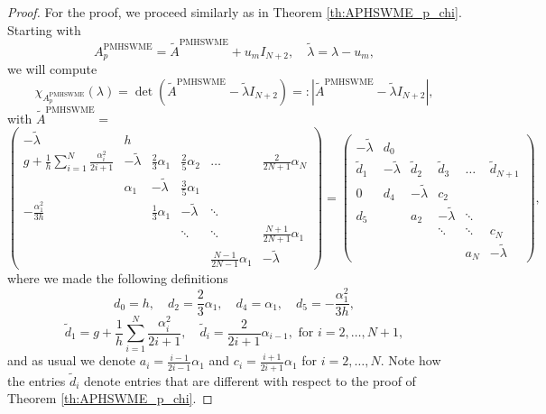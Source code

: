 \documentclass[10pt,a4paper]{amsart}
\begin{document}
\begin{proof}
    For the proof, we proceed similarly as in Theorem \ref{th:APHSWME_p_chi}. Starting with
    \begin{equation}
       A^{\textrm{PMHSWME}}_{p} = \widetilde{A}^{{\textrm{PMHSWME}}} + u_m I_{N+2}, \quad \widetilde{\lambda} = \lambda - u_m,
    \end{equation}
    we will compute
    \begin{equation}
       \chi_{A^{\textrm{PMHSWME}}_{p}}(\lambda) = \det\left( \widetilde{A}^{{\textrm{PMHSWME}}} - \widetilde{\lambda} I_{N+2} \right) =: \left| \widetilde{A}^{{\textrm{PMHSWME}}} - \widetilde{\lambda} I_{N+2} \right|,
    \end{equation}
    with $\widetilde{A}^{{\textrm{PMHSWME}}} =$
    \begin{equation}
        \left(\begin{array}{cccccc}
        - \widetilde{\lambda} & h &  &  &  &  \\
        g + \frac{1}{h} \sum\limits_{i=1}^N \frac{\alpha_i^2}{2i+1} & - \widetilde{\lambda} & \frac{2}{3} \alpha_1 & \frac{2}{5} \alpha_2 & \dots & \frac{2}{2N+1} \alpha_N \\
         & \alpha_1 & - \widetilde{\lambda} & \frac{3}{5} \alpha_1 & &\\
        -\frac{\alpha_1^2}{3h} &   & \frac{1}{3}\alpha_1 & - \widetilde{\lambda} & \ddots & \\
         &  &  & \ddots & \ddots & \frac{N+1}{2N+1}\alpha_1 \\
         &  &  &  & \frac{N-1}{2N-1}\alpha_1 & - \widetilde{\lambda}
        \end{array}\right) =
        \left(\begin{array}{cccccc}
        - \widetilde{\lambda} & d_0 &  &  &  &  \\
        \widetilde{d}_{1} & - \widetilde{\lambda} & \widetilde{d}_{2} & \widetilde{d}_{3} & \dots & \widetilde{d}_{{N+1}} \\
        0 & d_4 & - \widetilde{\lambda} & c_2 & &\\
        d_5 &   & a_2 & - \widetilde{\lambda} & \ddots & \\
         &  &  & \ddots & \ddots & c_N \\
         &  &  &  & a_N & - \widetilde{\lambda}
        \end{array}\right),
    \end{equation}
    where we made the following definitions
    \begin{equation}
       d_0 = h, \quad d_2 = \frac{2}{3}\alpha_{1}, \quad d_4 = \alpha_1, \quad d_5 = -\frac{\alpha_1^2}{3h},
    \end{equation}
    \begin{equation}
      \widetilde{d}_{1} = g + \frac{1}{h} \sum\limits_{i=1}^N \frac{\alpha_i^2}{2i+1}, \quad \widetilde{d}_{i} = \frac{2}{2i+1}\alpha_{i-1}, \textrm{ for } i=2,\ldots, N+1,
    \end{equation}
    and as usual we denote $a_i = \frac{i-1}{2i-1}\alpha_1$ and $c_i = \frac{i+1}{2i+1}\alpha_1$ for $i=2,\ldots, N$.
    Note how the entries $\widetilde{d}_{i}$ denote entries that are different with respect to the proof of Theorem \ref{th:APHSWME_p_chi}.


\end{proof}
\end{document}
